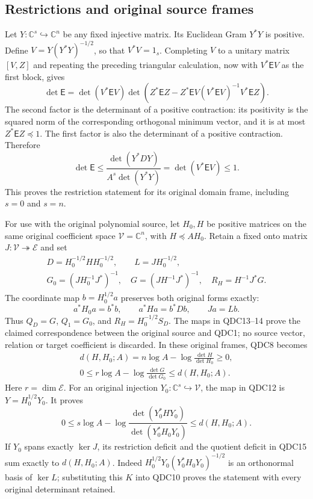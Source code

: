 \documentclass[11pt,a4paper]{article}
\begin{document}
\subsection{Restrictions and original source frames}

Let $Y:\mathbb C^s\hookrightarrow\mathbb C^n$ be any fixed injective
matrix. Its Euclidean Gram $Y^*Y$ is positive. Define
$V=Y(Y^*Y)^{-1/2}$, so that $V^*V=1_s$. Completing $V$ to a
unitary matrix $[V,Z]$ and repeating the preceding triangular
calculation, now with $V^*\mathsf EV$ as the first block, gives
\[
 \det\mathsf E=\det(V^*\mathsf EV)\det
 \left(Z^*\mathsf EZ
       -Z^*\mathsf EV(V^*\mathsf EV)^{-1}V^*\mathsf EZ\right).
 \tag{QDC11}
\]
The second factor is the determinant of a positive contraction:
its positivity is the squared norm of the corresponding
orthogonal minimum vector, and it is at most $Z^*\mathsf EZ\preceq1$.
The first factor is also the determinant of a positive contraction.
Therefore
\[
 \boxed{\displaystyle
 \det\mathsf E\le
 \frac{\det(Y^*DY)}{A^s\det(Y^*Y)}
 =\det(V^*\mathsf EV)\le1 .}
 \tag{QDC12}
\]
This proves the restriction statement for its original domain
frame, including $s=0$ and $s=n$.

For use with the original polynomial source, let $H_0,H$ be
positive matrices on the same original coefficient space
$\mathcal V=\mathbb C^n$, with $H\preceq AH_0$. Retain a fixed
onto matrix $J:\mathcal V\twoheadrightarrow\mathcal E$ and set
\[
 \begin{gathered}
 D=H_0^{-1/2}HH_0^{-1/2},\qquad L=JH_0^{-1/2},\\
 G_0=(JH_0^{-1}J^*)^{-1},\quad
 G=(JH^{-1}J^*)^{-1},\quad
 R_H=H^{-1}J^*G.
 \end{gathered}
 \tag{QDC13}
\]
The coordinate map $b=H_0^{1/2}a$ preserves both original
forms exactly:
\[
 a^*H_0a=b^*b,\qquad a^*Ha=b^*Db,\qquad Ja=Lb.
 \tag{QDC14}
\]
Thus $Q_D=G$, $Q_1=G_0$, and $R_H=H_0^{-1/2}S_D$.
The maps in QDC13--14 prove the claimed correspondence between
the original source and QDC1; no source vector, relation or
target coefficient is discarded. In these original frames,
QDC8 becomes
\[
 \begin{gathered}
 d(H,H_0;A)=n\log A-\log\frac{\det H}{\det H_0}\ge0,\\
 0\le
 r\log A-\log\frac{\det G}{\det G_0}
 \le d(H,H_0;A).
 \end{gathered}
 \tag{QDC15}
\]
Here $r=\dim\mathcal E$. For an original injection
$Y_0:\mathbb C^s\hookrightarrow\mathcal V$, the map in QDC12
is $Y=H_0^{1/2}Y_0$. It proves
\[
 0\le s\log A
       -\log\frac{\det(Y_0^*HY_0)}{\det(Y_0^*H_0Y_0)}
 \le d(H,H_0;A).
 \tag{QDC16}
\]
If $Y_0$ spans exactly $\ker J$, its restriction deficit and
the quotient deficit in QDC15 sum exactly to $d(H,H_0;A)$.
Indeed $H_0^{1/2}Y_0(Y_0^*H_0Y_0)^{-1/2}$ is an orthonormal
basis of $\ker L$; substituting this $K$ into QDC10 proves
the statement with every original determinant retained.
\end{document}
